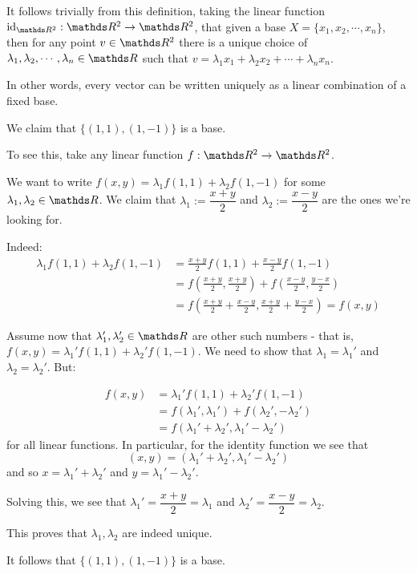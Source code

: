 \begin{rmk}
	It follows trivially from this definition, taking the linear function $\id_{\R^2}:\R^2\to\R^2$, that given a base $X=\{x_1,x_2,\cdots,x_n\}$, then for any point $v\in\R^2$ there is a unique choice of $\lambda_1,\lambda_2,\cdots,\lambda_n\in\R$ such that $v=\lambda_1x_1+\lambda_2x_2+\cdots+\lambda_nx_n$. 
	
	In other words, every vector can be written uniquely as a linear combination of a fixed base.
\end{rmk}

\begin{ex}
	We claim that $\{(1,1),(1,-1)\}$ is a base.
	
	To see this, take any linear function $f:\R^2\to\R^2$.
	
	We want to write $f(x,y)=\lambda_1 f(1,1)+\lambda_2 f(1,-1)$ for some $\lambda_1,\lambda_2\in\R$. We claim that $\lambda_1:=\dfrac{x+y}{2}$ and $\lambda_2:=\dfrac{x-y}{2}$ are the ones we're looking for.
	
	Indeed:
	\begin{align*}
		\lambda_1 f(1,1)+\lambda_2 f(1,-1)&=\frac{x+y}{2}f(1,1)+\frac{x-y}{2}f(1,-1)\\
		&=f\left(\frac{x+y}{2},\frac{x+y}{2}\right)+f\left(\frac{x-y}{2},\frac{y-x}{2}\right)\\
		&=f\left(\frac{x+y}{2}+\frac{x-y}{2},\frac{x+y}{2}+\frac{y-x}{2}\right)=f(x,y)
	\end{align*}
	
	Assume now that $\lambda_1',\lambda_2'\in \R$ are other such numbers - that is, $f(x,y)=\lambda_1'f(1,1)+\lambda_2'f(1,-1)$. We need to show that $\lambda_1=\lambda_1'$ and $\lambda_2=\lambda_2'$. But:
	
	\begin{align*}
		f(x,y)&=\lambda_1'f(1,1)+\lambda_2'f(1,-1)\\
		&=f(\lambda_1',\lambda_1')+f(\lambda_2',-\lambda_2')\\
		&=f(\lambda_1'+\lambda_2',\lambda_1'-\lambda_2')
	\end{align*}for all linear functions. In particular, for the identity function we see that 
	\[(x,y)=(\lambda_1'+\lambda_2',\lambda_1'-\lambda_2')\]and so $x=\lambda_1'+\lambda_2'$ and $y=\lambda_1'-\lambda_2'$.
	
	Solving this, we see that $\lambda_1'=\dfrac{x+y}{2}=\lambda_1$ and $\lambda_2'=\dfrac{x-y}{2}=\lambda_2$.
	
	This proves that $\lambda_1,\lambda_2$ are indeed unique. 
	
	It follows that $\{(1,1),(1,-1)\}$ is a base.
\end{ex}

